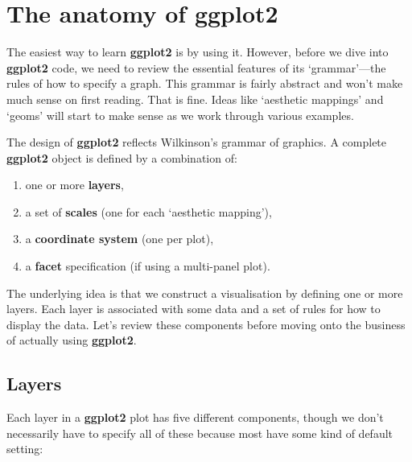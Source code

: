 \documentclass[
]{book}
\providecommand{\tightlist}{%
  \setlength{\itemsep}{0pt}\setlength{\parskip}{0pt}}
\begin{document}
\hypertarget{anatomy}{%
\section{The anatomy of ggplot2}\label{anatomy}}

The easiest way to learn \textbf{ggplot2} is by using it. However, before we dive into \textbf{ggplot2} code, we need to review the essential features of its `grammar'---the rules of how to specify a graph. This grammar is fairly abstract and won't make much sense on first reading. That is fine. Ideas like `aesthetic mappings' and `geoms' will start to make sense as we work through various examples.

The design of \textbf{ggplot2} reflects Wilkinson's grammar of graphics. A complete \textbf{ggplot2} object is defined by a combination of:

\begin{enumerate}
\def\labelenumi{\arabic{enumi})}
\tightlist
\item
  one or more \textbf{layers},
\item
  a set of \textbf{scales} (one for each `aesthetic mapping'),
\item
  a \textbf{coordinate system} (one per plot),
\item
  a \textbf{facet} specification (if using a multi-panel plot).
\end{enumerate}

The underlying idea is that we construct a visualisation by defining one or more layers. Each layer is associated with some data and a set of rules for how to display the data. Let's review these components before moving onto the business of actually using \textbf{ggplot2}.

\hypertarget{layers}{%
\subsection{Layers}\label{layers}}

Each layer in a \textbf{ggplot2} plot has five different components, though we don't necessarily have to specify all of these because most have some kind of default setting:
\end{document}
